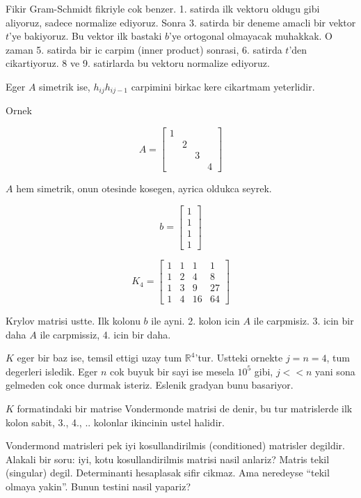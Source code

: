 \documentclass[12pt,fleqn]{article}\usepackage{../common}
\begin{document}
Fikir Gram-Schmidt fikriyle cok benzer. 1. satirda ilk vektoru oldugu gibi
aliyoruz, sadece normalize ediyoruz. Sonra 3. satirda bir deneme
amacli bir vektor $t$'ye  bakiyoruz. Bu vektor ilk bastaki $b$'ye ortogonal
olmayacak muhakkak. O zaman 5. satirda bir ic carpim (inner product)
sonrasi, 6. satirda $t$'den cikartiyoruz. 8 ve 9. satirlarda bu
vektoru normalize ediyoruz. 

Eger $A$ simetrik ise, $h_{ij}h_{ij-1}$ carpimini birkac kere cikartmam
yeterlidir. 

Ornek 

\[  
A = 
\left[\begin{array}{rrrr}
1 &&& \\
 & 2 && \\
 && 3 & \\
 &&& 4 
\end{array}\right]
\]

$A$ hem simetrik, onun otesinde kosegen, ayrica oldukca seyrek. 

\[  
b = 
\left[\begin{array}{r}
1 \\ 1\\ 1 \\ 1
\end{array}\right]
\]


\[  
K_4 = 
\left[\begin{array}{rrrr}
1 & 1 & 1 & 1\\
1 & 2 & 4 & 8\\
1 & 3 & 9 & 27\\
1 & 4 & 16 & 64 
\end{array}\right]
\]

Krylov matrisi ustte. Ilk kolonu $b$ ile ayni. 2. kolon icin $A$ ile
carpmisiz. 3. icin bir daha $A$ ile carpmissiz, 4. icin bir daha. 

$K$ eger bir baz ise, temsil ettigi uzay tum $\mathbb{R}^4$'tur. Ustteki
ornekte $j = n = 4$, tum degerleri isledik. Eger $n$ cok buyuk bir sayi ise
mesela $10^5$ gibi, $j << n$ yani sona gelmeden cok once durmak
isteriz. Eslenik gradyan bunu basariyor. 

$K$ formatindaki bir matrise Vondermonde matrisi de denir, bu tur
matrislerde ilk kolon sabit, 3., 4., .. kolonlar ikincinin ustel 
halidir. 

Vondermond matrisleri pek iyi kosullandirilmis (conditioned) matrisler
degildir. Alakali bir soru: iyi, kotu kosullandirilmis matrisi nasil
anlariz? Matris tekil (singular) degil. Determinanti hesaplasak sifir
cikmaz. Ama neredeyse ``tekil olmaya yakin''. Bunun testini nasil yapariz? 
\end{document}
